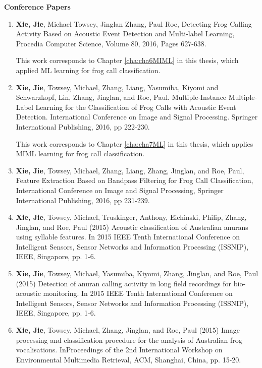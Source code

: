 { \textbf{Conference Papers}}
\begin{enumerate} 

\item \textbf{Xie, Jie}, Michael Towsey, Jinglan Zhang, Paul Roe, Detecting Frog Calling Activity Based on Acoustic Event Detection and Multi-label Learning, Procedia Computer Science, Volume 80, 2016, Pages 627-638.
 
 
This work corresponds to Chapter \ref{cha:cha6MIML} in this thesis, which applied ML learning for frog call classification. 
 
 
\item \textbf{Xie, Jie}, Towsey, Michael, Zhang, Liang, Yasumiba, Kiyomi and Schwarzkopf, Lin,  Zhang, Jinglan, and Roe, Paul. Multiple-Instance Multiple-Label Learning for the Classification of Frog Calls with Acoustic Event Detection. International Conference on Image and Signal Processing. Springer International Publishing, 2016, pp 222-230.
 
This work corresponds to Chapter \ref{cha:cha7ML} in this thesis, which applies MIML learning for frog call classification. 
 
 
 
\item \textbf{Xie, Jie}, Towsey, Michael, Zhang, Liang, Zhang, Jinglan, and Roe, Paul, Feature Extraction Based on Bandpass Filtering for Frog Call Classification, International Conference on Image and Signal Processing, Springer International Publishing, 2016, pp 231-239.


\item	\textbf{Xie, Jie}, Towsey, Michael, Truskinger, Anthony, Eichinski, Philip, Zhang, Jinglan, and Roe, Paul (2015) Acoustic classification of Australian anurans using syllable features. In 2015 IEEE Tenth International Conference on Intelligent Sensors, Sensor Networks and Information Processing (ISSNIP), IEEE, Singapore, pp. 1-6.

\item	\textbf{Xie, Jie}, Towsey, Michael, Yasumiba, Kiyomi, Zhang, Jinglan, and Roe, Paul (2015) Detection of anuran calling activity in long field recordings for bio-acoustic monitoring. In 2015 IEEE Tenth International Conference on Intelligent Sensors, Sensor Networks and Information Processing (ISSNIP), IEEE, Singapore, pp. 1-6.



\item	\textbf{Xie, Jie}, Towsey, Michael, Zhang, Jinglan, and Roe, Paul (2015) Image processing and classification procedure for the analysis of Australian frog vocalisations. InProceedings of the 2nd International Workshop on Environmental Multimedia Retrieval, ACM, Shanghai, China, pp. 15-20.



\end{enumerate}
